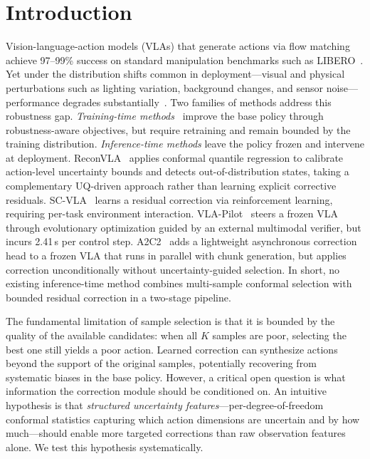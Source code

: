 \section{Introduction}
\label{sec:intro}

Vision-language-action models (VLAs) that generate actions via flow matching~\cite{black2024pi0,shukor2025smolvla} achieve 97--99\% success on standard manipulation benchmarks such as LIBERO~\cite{liu2023libero}.
Yet under the distribution shifts common in deployment---visual and physical perturbations such as lighting variation, background changes, and sensor noise---performance degrades substantially~\cite{fei2025liberoplus}.
Two families of methods address this robustness gap.
\emph{Training-time methods}~\cite{robustvla2025,srpo2025,digflow2025} improve the base policy through robustness-aware objectives, but require retraining and remain bounded by the training distribution.
\emph{Inference-time methods} leave the policy frozen and intervene at deployment.
ReconVLA~\cite{chen2026reconvla} applies conformal quantile regression to calibrate action-level uncertainty bounds and detects out-of-distribution states, taking a complementary UQ-driven approach rather than learning explicit corrective residuals.
SC-VLA~\cite{sc_vla_2026} learns a residual correction via reinforcement learning, requiring per-task environment interaction.
VLA-Pilot~\cite{vla_pilot_2025} steers a frozen VLA through evolutionary optimization guided by an external multimodal verifier, but incurs 2.41\,s per control step.
A2C2~\cite{a2c2_2025} adds a lightweight asynchronous correction head to a frozen VLA that runs in parallel with chunk generation, but applies correction unconditionally without uncertainty-guided selection.
In short, no existing inference-time method combines multi-sample conformal selection with bounded residual correction in a two-stage pipeline.

The fundamental limitation of sample selection is that it is bounded by the quality of the available candidates: when all $K$ samples are poor, selecting the best one still yields a poor action.
Learned correction can synthesize actions beyond the support of the original samples, potentially recovering from systematic biases in the base policy.
However, a critical open question is what information the correction module should be conditioned on.
An intuitive hypothesis is that \emph{structured uncertainty features}---per-degree-of-freedom conformal statistics capturing which action dimensions are uncertain and by how much---should enable more targeted corrections than raw observation features alone.
We test this hypothesis systematically.


